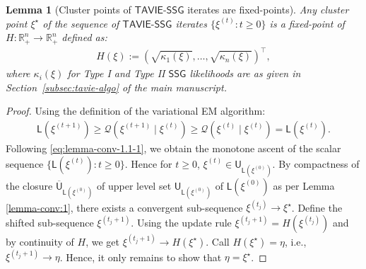\documentclass[12pt]{article}
\newtheorem{lemma}{Lemma}[section]
\numberwithin{equation}{section}
\newcommand{\ssg}{\mathsf{SSG}}
\newcommand{\tssg}{\mathsf{TAVIE}\text{-}\mathsf{SSG}}
\begin{document}
\begin{lemma}[Cluster points of $\tssg$ iterates are fixed-points]
\label{lemma-conv:1.1}
Any cluster point $\xi^{\star}$ of the sequence of $\tssg$ iterates $\{\xi^{(t)}: t\geq 0\}$ is a fixed-point of $H: \mathbb{R}^{n}_{+} \to \mathbb{R}^{n}_{+}$ defined as:
\begin{align}
    H(\xi):= \left(\sqrt{\kappa_1(\xi)}, \ldots, \sqrt{\kappa_n(\xi)}\right)^{\top},
\end{align}
where $\kappa_{i}(\xi)$ for Type I and Type II $\ssg$ likelihoods are as given in Section~\ref{subsec:tavie-algo} of the main manuscript.
\end{lemma}

\begin{proof}
Using the definition of the variational EM algorithm:
\begin{align}\label{eq:lemma-conv-1.1-1}
    \mathsf{L}(\xi^{(t+1)}) \geq \mathcal{Q}(\xi^{(t+1)} \mid \xi^{(t)}) \geq \mathcal{Q}(\xi^{(t)} \mid \xi^{(t)}) = \mathsf{L}(\xi^{(t)}).
\end{align}
Following \eqref{eq:lemma-conv-1.1-1}, we obtain the monotone ascent of the scalar sequence $\{\mathsf{L}(\xi^{(t)}): t\geq 0\}$. Hence for $t\geq 0$, $\xi^{(t)} \in \mathsf{U}_{\mathsf{L}(\xi^{(0)})}$. By compactness of the closure $\overline{\mathsf{U}}_{\mathsf{L}(\xi^{(0)})}$ of upper level set $\mathsf{U}_{\mathsf{L}(\xi^{(0)})}$ of $\mathsf{L}(\xi^{(0)})$ as per Lemma \ref{lemma-conv:1}, there exists a convergent sub-sequence $\xi^{(t_j)} \to \xi^{\star}$. Define the shifted sub-sequence $\xi^{(t_j+1)}$. Using the update rule $\xi^{(t_j+1)} = H(\xi^{(t_j)})$ and by continuity of $H$, we get $\xi^{(t_j+1)} \to H(\xi^{\star})$. Call $H(\xi^{\star}) = \eta$, i.e., $\xi^{(t_j+1)} \to \eta$. Hence, it only remains to show that $\eta = \xi^{\star}$.


\end{proof}
\end{document}
